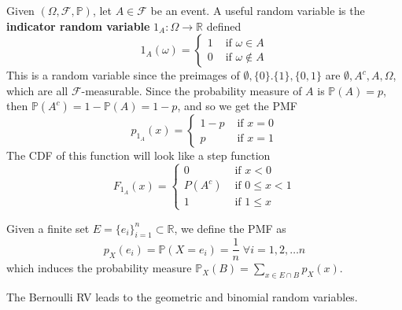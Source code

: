 \documentclass{article}
\begin{document}
      \begin{definition}
        Given $(\Omega, \mathcal{F}, \mathbb{P})$, let $A \in \mathcal{F}$ be an event. A useful random variable is the \textbf{indicator random variable} $1_A: \Omega \longrightarrow \mathbb{R}$ defined  
        \begin{equation}
          1_A (\omega) = \begin{cases} 1 & \text{ if } \omega \in A \\ 0 & \text{ if } \omega \not\in A \end{cases}
        \end{equation}
        This is a random variable since the preimages of $\emptyset, \{0\}. \{1\}, \{0, 1\}$ are $\emptyset, A^c, A, \Omega$, which are all $\mathcal{F}$-measurable. Since the probability measure of $A$ is $\mathbb{P}(A) = p$, then $\mathbb{P}(A^c) = 1 - \mathbb{P}(A) = 1 - p$, and so we get the PMF 
        \begin{equation}
          p_{1_A} (x) = \begin{cases} 1 - p & \text{ if } x = 0 \\ p & \text{ if } x = 1 \end{cases}
        \end{equation}
        The CDF of this function will look like a step function 
        \begin{equation}
          F_{1_A} (x) = \begin{cases} 0 & \text{ if } x < 0  \\ P(A^c) & \text{ if } 0 \leq x < 1 \\ 1 & \text{ if } 1 \leq x \end{cases}
        \end{equation}
      \end{definition}

      \begin{example}
        Given a finite set $E = \{e_i\}_{i=1}^n \subset \mathbb{R}$, we define the PMF as 
        \begin{equation}
          p_X (e_i) = \mathbb{P}(X = e_i) = \frac{1}{n} \; \forall i = 1, 2, \ldots n
        \end{equation}
        which induces the probability measure $\mathbb{P}_X (B) = \sum_{x \in E \cap B} p_X (x)$. 
      \end{example}

      The Bernoulli RV leads to the geometric and binomial random variables. 
\end{document}
